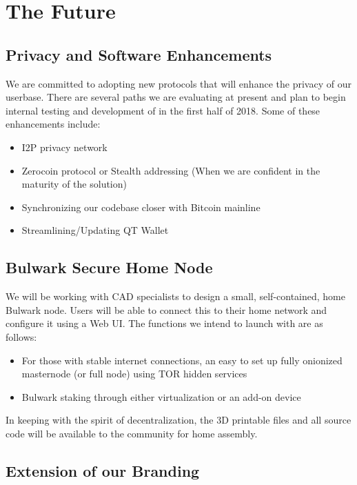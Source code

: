 \documentclass[11pt,a4paperpaper,]{report}
\providecommand{\tightlist}{%
  \setlength{\itemsep}{0pt}\setlength{\parskip}{0pt}}
\begin{document}
\chapter{The Future}\label{the-future}

\section{Privacy and Software
Enhancements}\label{privacy-and-software-enhancements}

We are committed to adopting new protocols that will enhance the privacy
of our userbase. There are several paths we are evaluating at present
and plan to begin internal testing and development of in the first half
of 2018. Some of these enhancements include:

\begin{itemize}
\tightlist
\item
  I2P privacy network
\item
  Zerocoin protocol or Stealth addressing (When we are confident in the
  maturity of the solution)
\item
  Synchronizing our codebase closer with Bitcoin mainline
\item
  Streamlining/Updating QT Wallet
\end{itemize}

\section{Bulwark Secure Home Node}\label{bulwark-secure-home-node}

We will be working with CAD specialists to design a small,
self-contained, home Bulwark node. Users will be able to connect this to
their home network and configure it using a Web UI. The functions we
intend to launch with are as follows:

\begin{itemize}
\tightlist
\item
  For those with stable internet connections, an easy to set up fully
  onionized masternode (or full node) using TOR hidden services
\item
  Bulwark staking through either virtualization or an add-on device
\end{itemize}

In keeping with the spirit of decentralization, the 3D printable files
and all source code will be available to the community for home
assembly.

\section{Extension of our Branding}\label{extension-of-our-branding}
\end{document}
